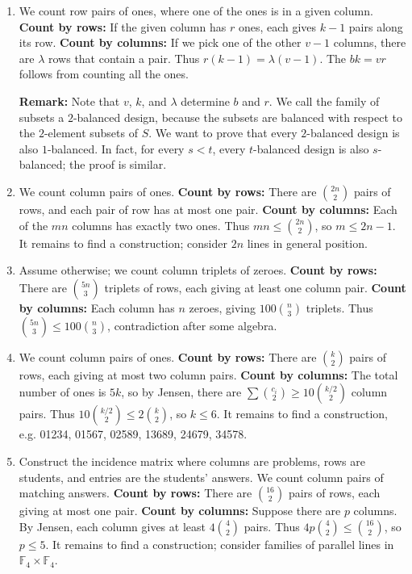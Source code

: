 \documentclass[11pt,paper=letter]{scrartcl}
\newcommand{\cbyrows}{{\bfseries \color{RowBlue} Count by rows: }}
\newcommand{\cbycols}{{\bfseries \color{ColOrange} Count by columns: }}
\begin{document}
\begin{enumerate}

\item We count row pairs of ones, where one of the ones is in a given column. \cbyrows If the given column has $r$ ones, each gives $k-1$ pairs along its row. \cbycols If we pick one of the other $v-1$ columns, there are $\lambda$ rows that contain a pair. Thus $r(k-1) = \lambda(v-1)$. The $bk = vr$ follows from counting all the ones.

\textbf{Remark:} Note that $v$, $k$, and $\lambda$ determine $b$ and $r$. We call the family of subsets a $2$-balanced design, because the subsets are balanced with respect to the $2$-element subsets of $S$. We want to prove that every $2$-balanced design is also $1$-balanced. In fact, for every $s < t$, every $t$-balanced design is also $s$-balanced; the proof is similar.

\item We count column pairs of ones. \cbyrows There are $ \binom{2n}{2} $ pairs of rows, and each pair of row has at most one pair. \cbycols Each of the $mn$ columns has exactly two ones. Thus $mn \le \binom{2n}{2}$, so $m \le 2n - 1$. It remains to find a construction; consider $2n$ lines in general position.

\item Assume otherwise; we count column triplets of zeroes. \cbyrows There are $\binom{5n}{3}$ triplets of rows, each giving at least one column pair. \cbycols Each column has $n$ zeroes, giving $100 \binom{n}{3}$ triplets. Thus $\binom{5n}{3} \le 100 \binom{n}{3}$, contradiction after some algebra.

\item We count column pairs of ones. \cbyrows There are $\binom{k}{2}$ pairs of rows, each giving at most two column pairs. \cbycols The total number of ones is $5k$, so by Jensen, there are $\sum \binom{c_i}{2} \ge 10 \binom{k/2}{2}$ column pairs. Thus $10\binom{k/2}{2} \le 2\binom{k}{2}$, so $k \le 6$. It remains to find a construction, e.g. 01234, 01567, 02589, 13689, 24679, 34578.

\item Construct the incidence matrix where columns are problems, rows are students, and entries are the students' answers. We count column pairs of matching answers. \cbyrows There are $\binom{16}{2}$ pairs of rows, each giving at most one pair. \cbycols Suppose there are $p$ columns. By Jensen, each column gives at least $4\binom42$ pairs. Thus $4p\binom42 \le \binom{16}{2}$, so $p \le 5$. It remains to find a construction; consider families of parallel lines in $\mathbb{F}_4 \times \mathbb{F}_4$.


\end{enumerate}
\end{document}
